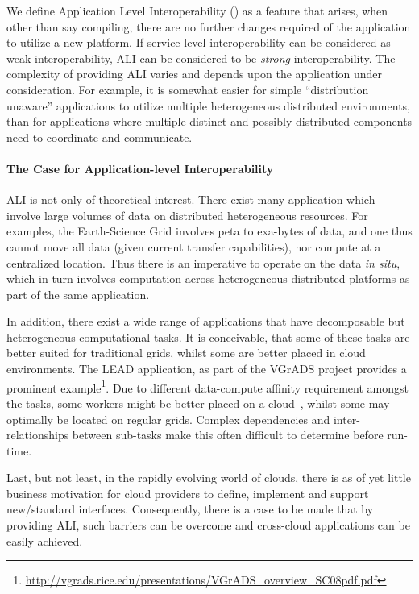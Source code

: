 \documentclass[3p,twocolumn]{elsarticle}
\begin{document}
We define Application Level Interoperability () as a feature
that arises, when other than say compiling, there
are no further changes required of the application to utilize a new
platform.  If service-level interoperability can be considered as weak
interoperability, ALI can be considered to be {\it strong}
interoperability.  
The complexity of providing ALI varies and depends upon the
application under consideration.  For example, it is somewhat easier
for simple ``distribution unaware'' applications to utilize multiple
heterogeneous distributed environments, than for applications where
multiple distinct and possibly distributed components need to
coordinate and communicate.  


\paragraph{The Case for Application-level Interoperability}

ALI is not only of theoretical interest. There exist many application
which involve large volumes of data on distributed heterogeneous
resources. For examples, the Earth-Science Grid involves peta to
exa-bytes of data, and one thus cannot move all data (given
current transfer capabilities), nor compute at a centralized location.
Thus there is an imperative to operate on the data {\it in situ},
which in turn involves computation across heterogeneous distributed
platforms as part of the same application.
 
In addition, there exist a wide range of applications that have
decomposable but heterogeneous computational tasks. It is conceivable,
that some of these tasks are better suited for traditional grids,
whilst some are better placed in cloud environments.  The LEAD
application, as part of the VGrADS project provides a prominent
example\footnote{\url{http://vgrads.rice.edu/presentations/VGrADS_overview_SC08pdf.pdf}}.
Due to different data-compute affinity requirement amongst the tasks,
some workers might be better placed on a cloud~\cite{jha_ccpe09},
whilst some may optimally be located on regular grids. Complex
dependencies and inter-relationships between sub-tasks make this often
difficult to determine before run-time. 

Last, but not least, in the rapidly evolving world of clouds, there is
as of yet little business motivation for cloud providers to define,
implement and support new/standard interfaces. Consequently, there is
a case to be made that by providing ALI, such barriers can be overcome
and cross-cloud applications can be easily achieved.
 
\end{document}
